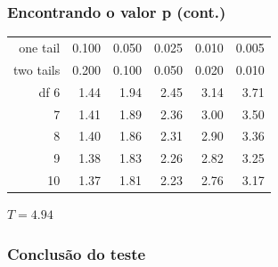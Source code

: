 \begin{frame}
\frametitle{Encontrando o valor p (cont.)}


{\scriptsize
\begin{center}
\begin{tabular}{r | rrr rr}
\hline
one tail & \hspace{1.5mm}  0.100 & \hspace{1.5mm} 0.050 & \hspace{1.5mm} 0.025 & \hspace{1.5mm} 0.010 & \hspace{1.5mm} 0.005  \\
two tails & 0.200 & 0.100 & 0.050 & 0.020 & 0.010 \\
\hline
{df} \hfill 6  &  {  1.44} & {  1.94} & {  2.45} & {  3.14} & {  3.71}  \\ 
7  &  {  1.41} & {  1.89} & {  2.36} & {  3.00} & {  3.50}  \\ 
8  &  {  1.40} & {  1.86} & {  2.31} & {  2.90} & {  3.36}  \\ 
  \rowcolor[gray]{.6}
9  &  {  1.38} & {  1.83} & {  2.26} & {  2.82} & {  3.25}  \\ 
10  &  {  1.37} & {  1.81} & {  2.23} & {  2.76} & {  3.17}  \\ 
\end{tabular}
\vspace{1cm}
{
$T = 4.94$}

\end{center}
}

\end{frame}


\begin{frame}
\frametitle{Conclusão do teste}
\justifying
{}
\justifying
\pause
{}


\end{frame}


